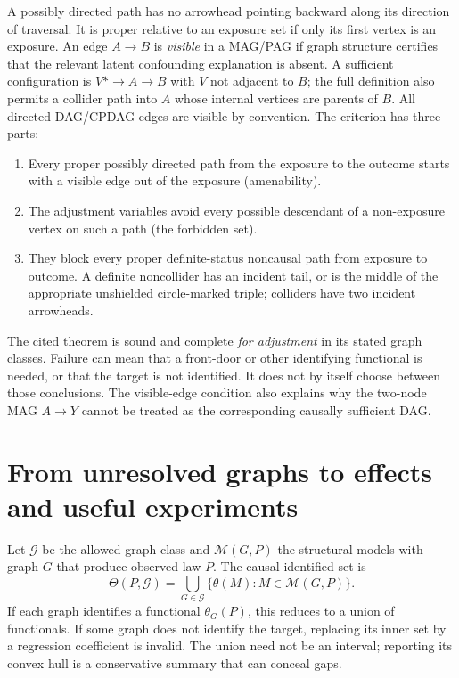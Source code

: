 A possibly directed path has no arrowhead pointing backward along its
direction of traversal. It is proper relative to an exposure set if
only its first vertex is an exposure. An edge $A\to B$ is \emph{visible}
in a MAG/PAG if graph structure certifies that the relevant latent
confounding explanation is absent. A sufficient configuration is
$V\mathbin{*\!\to}A\to B$ with $V$ not adjacent to $B$; the full
definition also permits a collider path into $A$ whose internal vertices
are parents of $B$. All directed DAG/CPDAG edges are visible by convention.
The criterion has three parts:
\begin{enumerate}
\item Every proper possibly directed path from the exposure to the
outcome starts with a visible edge out of the exposure (amenability).
\item The adjustment variables avoid every possible descendant of a
non-exposure vertex on such a path (the forbidden set).
\item They block every proper definite-status noncausal path from
exposure to outcome. A definite noncollider has an incident tail, or
is the middle of the appropriate unshielded circle-marked triple;
colliders have two incident arrowheads.
\end{enumerate}
The cited theorem is sound and complete \emph{for adjustment} in its
stated graph classes. Failure can mean that a front-door or other
identifying functional is needed, or that the target is not identified.
It does not by itself choose between those conclusions. The visible-edge
condition also explains why the two-node MAG $A\to Y$ cannot be
treated as the corresponding causally sufficient DAG.

\section{From unresolved graphs to effects and useful experiments}
\label{r3:graph-effects}
Let $\mathcal G$ be the allowed graph class and $\mathcal M(G,P)$
the structural models with graph $G$ that produce observed law $P$.
The causal identified set is
\begin{equation}
 \Theta(P,\mathcal G)=
 \bigcup_{G\in\mathcal G}\{\theta(M):M\in\mathcal M(G,P)\}.
 \label{r3:graph-union}
\end{equation}
If each graph identifies a functional $\theta_G(P)$, this reduces to
a union of functionals. If some graph does not identify the target,
replacing its inner set by a regression coefficient is invalid.
The union need not be an interval; reporting its convex hull is a
conservative summary that can conceal gaps.

